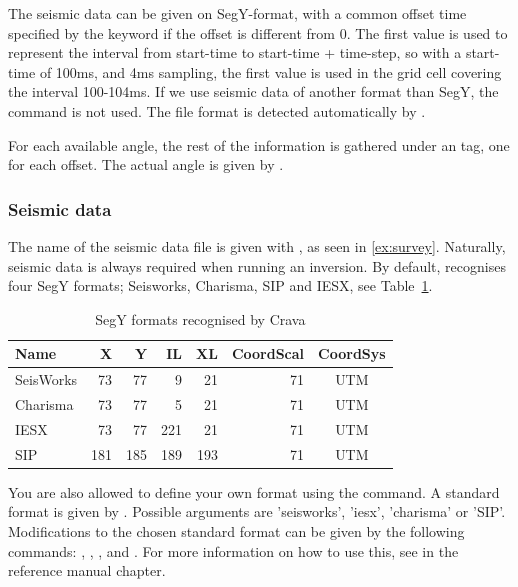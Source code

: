 The seismic data can be given on SegY-format, with a common offset time
specified by the keyword 
if the offset is different from 0. The first value is used to
represent the interval from start-time to start-time + time-step, so
with a start-time of 100ms, and 4ms sampling, the first value is used
in the grid cell covering the interval 100-104ms. If we use seismic
data of another format than SegY, the  command is
not used. The file format is detected automatically by \crava.

For each available angle, the rest of the information is gathered under an  tag, one for each offset. The actual angle is given by .

\subsubsection{Seismic data}
\label{sec:basicseis}
The name of the seismic data file is given with , as seen in \autoref{ex:survey}. Naturally, seismic data is always required when running an inversion.
By default, \crava recognises four SegY formats; Seisworks, Charisma, SIP and IESX, see Table~\ref{tab:segyformats}. 
\begin{table}[h]
\centering
\caption{SegY formats recognised by Crava}
\label{tab:segyformats}
\begin{tabular}{|l|r|r|r|r|r|c|}
\hline
Name & X & Y & IL & XL & CoordScal & CoordSys \\ \hline \hline
SeisWorks & 73 & 77 & 9 & 21 & 71 & UTM \\ \hline
Charisma & 73 & 77 & 5 & 21 & 71 & UTM \\ \hline
IESX & 73 & 77 & 221 & 21 & 71 & UTM \\ \hline
SIP & 181 & 185 & 189 & 193 & 71 & UTM  \\ \hline
\end{tabular}
\end{table}

You are also allowed to define your own format using the  command. A standard format is given by . Possible arguments are 'seisworks', 'iesx', 'charisma' or 'SIP'. Modifications to the chosen standard format can be given by the following commands: , , ,  and . For more information on how to use this, see  in the reference manual chapter.
 
